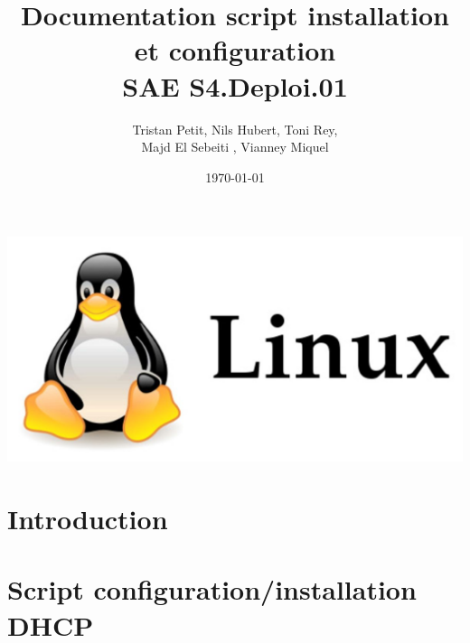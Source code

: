 \documentclass{article}
\begin{document}
\title{Documentation script installation et configuration \\ SAE S4.Deploi.01}
\author{Tristan Petit, Nils Hubert, Toni Rey,\\ 
 Majd El Sebeiti , Vianney Miquel}
\date{\today}
\maketitle
\begin{center}
    \centering
    \vspace{1cm} %
    \includegraphics[width=1\textwidth]{Images/logo_rendus.jpg} %
\end{center}

\maketitle

\newpage
\renewcommand{\contentsname}{Table des matières}

\tableofcontents

\newpage
{}

\section{Introduction}




\section{Script configuration/installation DHCP}

\end{document}
